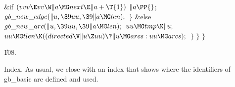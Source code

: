\&{if} ${}(\\{vvv}\E\\{vv}\W\|a\MG\\{next}\E\|a+\T{1}){}$\1\5
${}\|a\PP{}$;\2\6
${}\\{gb\_new\_edge}(\|u,\39\\{uu},\39\|a\MG\\{len});{}$\6
\4${}\}{}$\5
\2\&{else}\1\5
${}\\{gb\_new\_arc}(\|u,\39\\{uu},\39\|a\MG\\{len});{}$\2\6
${}\\{uu}\MG\\{tmp}\K\|u;{}$\6
${}\\{uu}\MG\\{tlen}\K((\\{directed}\V\|u\Z\\{uu})\?\|u\MG\\{arcs}:\\{uu}\MG%
\\{arcs});{}$\6
\4${}\}{}$\2\6
\4${}\}{}$\2\6
\4${}\}{}$\2\par
\U108.\fi

Index. As usual, we close with an index that
shows where the identifiers of \\{gb\_basic} are defined and used.
\fi

\inx
\fin
\con
